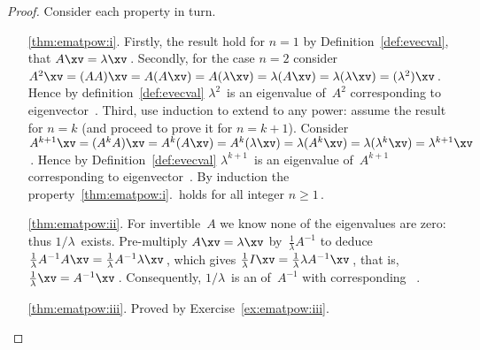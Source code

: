 \begin{proof} 
Consider each property in turn.
\begin{itemize}
\item[\ref{thm:ematpow:i}.]  
Firstly, the result hold for \(n=1\) by Definition~\ref{def:evecval}, that \(A\xv=\lambda\xv\)\,.
Secondly, for the case \(n=2\)  consider \(A^2\xv=(AA)\xv=A(A\xv)=A(\lambda\xv)=\lambda(A\xv)=\lambda(\lambda\xv)=(\lambda^2)\xv\)\,.  
Hence by definition~\ref{def:evecval} \(\lambda^2\)~is an eigenvalue of~\(A^2\) corresponding to eigenvector~\xv.
Third, use induction to extend to any power: assume the result for \(n=k\) (and proceed to prove it for \(n=k+1\)).
Consider \(A^{k+1}\xv=(A^kA)\xv=A^k(A\xv)=A^k(\lambda\xv)=\lambda(A^k\xv)=\lambda(\lambda^k\xv)=\lambda^{k+1}\xv\)\,.
Hence by Definition~\ref{def:evecval} \(\lambda^{k+1}\)~is an eigenvalue of~\(A^{k+1}\) corresponding to eigenvector~\xv.
By induction the property~\ref{thm:ematpow:i}.\ holds for all integer \(n\geq1\)\,.

\item[\ref{thm:ematpow:ii}.]  
For invertible~\(A\) we know none of the eigenvalues are zero: thus \(1/\lambda\)~exists.
Pre-multiply \(A\xv=\lambda\xv\) by~\(\frac1\lambda A^{-1}\) to deduce
\(\frac1\lambda A^{-1}A\xv=\frac1\lambda A^{-1}\lambda\xv\)\,, which gives \(\frac1\lambda I\xv=\frac1\lambda \lambda A^{-1}\xv\)\,, that is, \(\frac1\lambda\xv= A^{-1}\xv\)\,.  
Consequently, \(1/\lambda\)~is an  of~\(A^{-1}\) with corresponding ~\xv.

\item[\ref{thm:ematpow:iii}.] Proved by Exercise~\ref{ex:ematpow:iii}.  
\end{itemize}
\end{proof}




